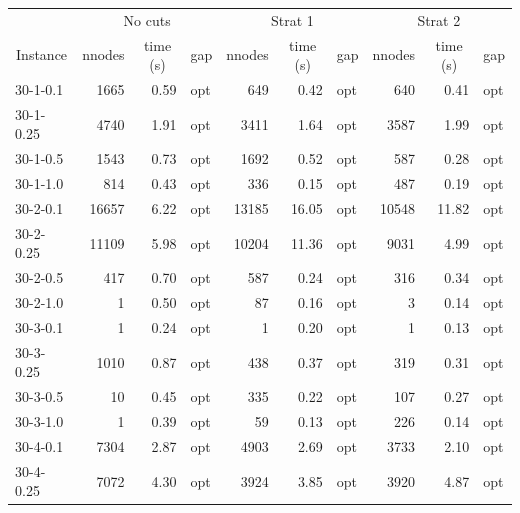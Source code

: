 \documentclass[11pt]{article}
\begin{document}
\begin{table}[]
\begin{tabular}{lrrlrrlrrl}
          & \multicolumn{3}{c}{No cuts} & \multicolumn{3}{c}{Strat 1} & \multicolumn{3}{c}{Strat 2} \\
\multicolumn{1}{c}{Instance} &
  \multicolumn{1}{c}{nnodes} &
  \multicolumn{1}{c}{time (s)} &
  \multicolumn{1}{c}{gap} &
  \multicolumn{1}{c}{nnodes} &
  \multicolumn{1}{c}{time (s)} &
  \multicolumn{1}{c}{gap} &
  \multicolumn{1}{c}{nnodes} &
  \multicolumn{1}{c}{time (s)} &
  \multicolumn{1}{c}{gap} \\
30-1-0.1  & 1665     & 0.59    & opt    & 649      & 0.42     & opt   & 640      & 0.41     & opt   \\
30-1-0.25 & 4740     & 1.91    & opt    & 3411     & 1.64     & opt   & 3587     & 1.99     & opt   \\
30-1-0.5  & 1543     & 0.73    & opt    & 1692     & 0.52     & opt   & 587      & 0.28     & opt   \\
30-1-1.0  & 814      & 0.43    & opt    & 336      & 0.15     & opt   & 487      & 0.19     & opt   \\
30-2-0.1  & 16657    & 6.22    & opt    & 13185    & 16.05    & opt   & 10548    & 11.82    & opt   \\
30-2-0.25 & 11109    & 5.98    & opt    & 10204    & 11.36    & opt   & 9031     & 4.99     & opt   \\
30-2-0.5  & 417      & 0.70    & opt    & 587      & 0.24     & opt   & 316      & 0.34     & opt   \\
30-2-1.0  & 1        & 0.50    & opt    & 87       & 0.16     & opt   & 3        & 0.14     & opt   \\
30-3-0.1  & 1        & 0.24    & opt    & 1        & 0.20     & opt   & 1        & 0.13     & opt   \\
30-3-0.25 & 1010     & 0.87    & opt    & 438      & 0.37     & opt   & 319      & 0.31     & opt   \\
30-3-0.5  & 10       & 0.45    & opt    & 335      & 0.22     & opt   & 107      & 0.27     & opt   \\
30-3-1.0  & 1        & 0.39    & opt    & 59       & 0.13     & opt   & 226      & 0.14     & opt   \\
30-4-0.1  & 7304     & 2.87    & opt    & 4903     & 2.69     & opt   & 3733     & 2.10     & opt   \\
30-4-0.25 & 7072     & 4.30    & opt    & 3924     & 3.85     & opt   & 3920     & 4.87     & opt   \\

\end{tabular}
\end{table}
\end{document}
